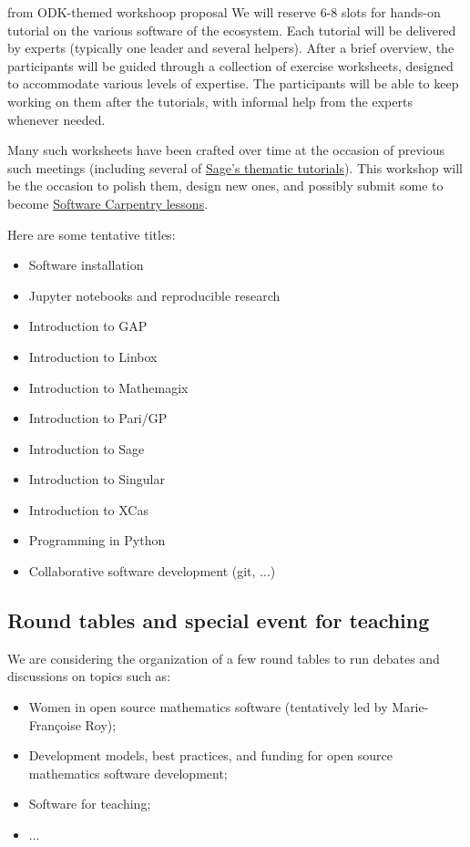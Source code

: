 \begin{oldpart}{from ODK-themed workshoop proposal}
We will reserve 6-8 slots for hands-on tutorial on the various
software of the ecosystem. Each tutorial will be delivered by experts
(typically one leader and several helpers). After a brief overview,
the participants will be guided through a collection of exercise
worksheets, designed to accommodate various levels of expertise.  The
participants will be able to keep working on them after the tutorials,
with informal help from the experts whenever needed.

Many such worksheets have been crafted over time at the occasion of
previous such meetings (including several of
\href{http://doc.sagemath.org/html/en/thematic_tutorials/}{Sage's
  thematic tutorials}). This workshop will be the occasion to polish them,
design new ones, and possibly submit some to become
\href{http://software-carpentry.org/lessons/}{Software Carpentry lessons}.

Here are some tentative titles:
\begin{itemize}
\item Software installation
\item Jupyter notebooks and reproducible research
\item Introduction to GAP
\item Introduction to Linbox
\item Introduction to Mathemagix
\item Introduction to Pari/GP
\item Introduction to Sage
\item Introduction to Singular
\item Introduction to XCas
\item Programming in Python
\item Collaborative software development (git, ...)
\end{itemize}

\subsection{Round tables and special event for teaching}

We are considering the organization of a few round tables to run
debates and discussions on topics such as:

\begin{itemize}
\item Women in open source mathematics software (tentatively led by
  Marie-Françoise Roy);
\item Development models, best practices, and funding for open source
  mathematics software development;
\item Software for teaching;
\item ...
\end{itemize}


\end{oldpart}
